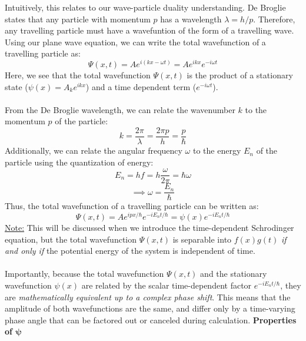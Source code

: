 \documentclass[12pt]{article}
\begin{document}
Intuitively, this relates to our wave-particle duality understanding. De Broglie states that any particle with momentum $p$ has a wavelength $\lambda = h/p$. Therefore, any travelling particle must have a wavefuntion of the form of a travelling wave. Using our plane wave equation, we can write the total wavefunction of a travelling particle as:
\[\Psi(x,t) = Ae^{i(kx - \omega t)}=A e^{ikx}e^{-i\omega t}\]
Here, we see that the total wavefunction $\Psi(x,t)$ is the product of a stationary state ($\psi(x)=A_k e^{ikx}$) and a time dependent term ($e^{-i\omega t}$).\\\\
From the De Broglie wavelength, we can relate the wavenumber $k$ to the momentum $p$ of the particle:
\[k = \frac{2\pi}{\lambda} = \frac{2\pi p}{h} = \frac{p}{\hbar}\]
Additionally, we can relate the angular frequency $\omega$ to the energy $E_n$ of the particle using the quantization of energy:
\[E_n = hf=  h \frac{\omega}{2 \pi}=\hbar \omega\]
\[ \implies \omega = \frac{E_n}{\hbar} \]
Thus, the total wavefunction of a travelling particle can be written as:
\[\boxed{\Psi(x,t) = A e^{ipx/\hbar}e^{-iE_n t/\hbar} = \psi(x)e^{-iE_n t/\hbar} }\]
\underline{Note:} This will be discussed when we introduce the time-dependent Schrodinger equation, but the total wavefunction $\Psi(x,t)$ is separable into $f(x)g(t)$ \textit{if and only if} the potential energy of the system is independent of time.\\\\
Importantly, because the total wavefunction $\Psi(x,t)$ and the stationary wavefunction $\psi(x)$ are related by the scalar time-dependent factor $e^{-iE_n t/\hbar}$, they are \textit{mathematically equivalent up to a complex phase shift}. This means that the amplitude of both wavefunctions are the same, and differ only by a time-varying phase angle that can be factored out or canceled during calculation.
\newpage\noindent
\textbf{Properties of $\mathbf{\psi}$}
\end{document}
